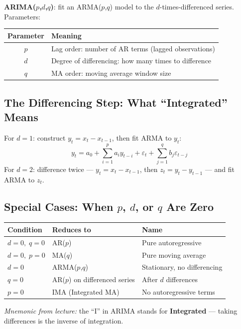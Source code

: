 \documentclass[11pt]{article}
\begin{document}
\textbf{ARIMA($p$,$d$,$q$)}: fit an ARMA($p$,$q$) model to the
$d$-times-differenced series. Parameters:
\begin{center}
\begin{tabular}{@{}cl@{}}
\toprule
\textbf{Parameter} & \textbf{Meaning} \\
\midrule
$p$ & Lag order: number of AR terms (lagged observations) \\
$d$ & Degree of differencing: how many times to difference \\
$q$ & MA order: moving average window size \\
\bottomrule
\end{tabular}
\end{center}

\subsection{The Differencing Step: What ``Integrated'' Means}
For $d=1$: construct $y_t = x_t - x_{t-1}$, then fit ARMA to $y_t$:
\[
y_t = a_0 + \sum_{i=1}^{p} a_i y_{t-i} + \varepsilon_t
    + \sum_{j=1}^{q} b_j \varepsilon_{t-j}
\]
For $d=2$: difference twice --- $y_t = x_t - x_{t-1}$, then
$z_t = y_t - y_{t-1}$ --- and fit ARMA to $z_t$.

\subsection{Special Cases: When $p$, $d$, or $q$ Are Zero}
\begin{center}
\begin{tabular}{@{}lll@{}}
\toprule
\textbf{Condition} & \textbf{Reduces to} & \textbf{Name} \\
\midrule
$d=0,\; q=0$        & AR($p$)          & Pure autoregressive \\
$d=0,\; p=0$        & MA($q$)          & Pure moving average \\
$d=0$               & ARMA($p$,$q$)    & Stationary, no differencing \\
$q=0$               & AR($p$) on differenced series & After $d$ differences \\
$p=0$               & IMA (Integrated MA) & No autoregressive terms \\
\bottomrule
\end{tabular}
\end{center}

\textit{Mnemonic from lecture:} the ``I'' in ARIMA stands for
\textbf{Integrated} --- taking differences is the inverse of integration.
\end{document}
